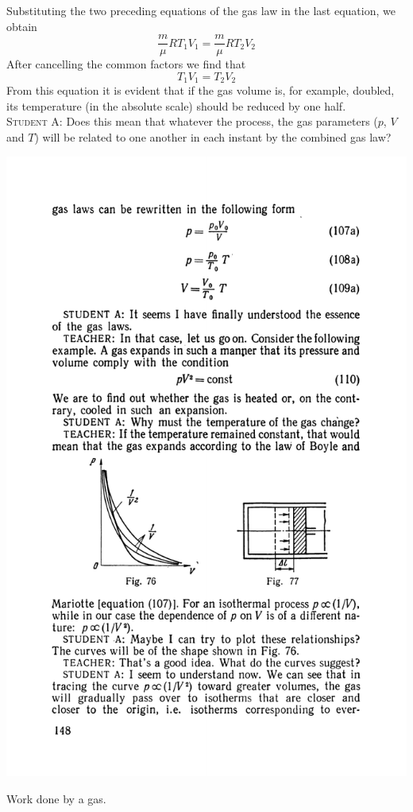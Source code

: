 \documentclass[a4paper,sfsidenotes]{tufte-book}
\begin{document}
Substituting the two preceding equations of the gas law in the last equation, we obtain
\begin{equation*}%
\frac{m}{\mu} R T_{1} V_{1} = \frac{m}{\mu} R T_{2}V_{2}
\end{equation*}
After cancelling the common factors we find that
\begin{equation}
T_{1} V_{1} = T_{2}V_{2}
\label{eq-111}
\end{equation}
From this equation it is evident that if the gas volume is, for example, doubled, its temperature (in the absolute scale) should be reduced by one half.
\\
\textsc{Student A:} Does this mean that whatever the process, the gas parameters ($p$, $V$ and $T$) will be related to one another in each instant by the combined gas law?
\\
\begin{marginfigure}
\centering
\includegraphics[width=\linewidth]{fig-077a}
\caption{Work done by a gas.}
\label{fig-77}
\end{marginfigure}
\end{document}
